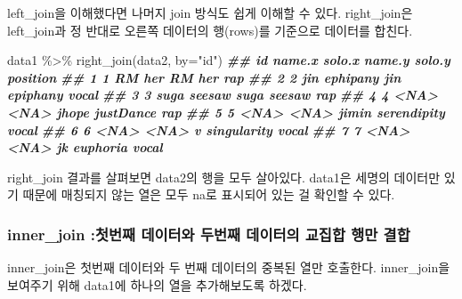 \documentclass[
]{book}
\newenvironment{Shaded}{\begin{snugshade}}{\end{snugshade}}
\newcommand{\AttributeTok}[1]{\textcolor[rgb]{0.77,0.63,0.00}{#1}}
\newcommand{\DocumentationTok}[1]{\textcolor[rgb]{0.56,0.35,0.01}{\textbf{\textit{#1}}}}
\newcommand{\FunctionTok}[1]{\textcolor[rgb]{0.00,0.00,0.00}{#1}}
\newcommand{\NormalTok}[1]{#1}
\newcommand{\SpecialCharTok}[1]{\textcolor[rgb]{0.00,0.00,0.00}{#1}}
\newcommand{\StringTok}[1]{\textcolor[rgb]{0.31,0.60,0.02}{#1}}
\theoremstyle{definition}
\theoremstyle{definition}
\theoremstyle{definition}
\theoremstyle{definition}
\theoremstyle{remark}
\begin{document}
left\_join을 이해했다면 나머지 join 방식도 쉽게 이해할 수 있다. right\_join은 left\_join과 정 반대로 오른쪽 데이터의 행(rows)를 기준으로 데이터를 합친다.

\begin{Shaded}
\begin{Highlighting}[]
\NormalTok{data1 }\SpecialCharTok{\%\textgreater{}\%} 
  \FunctionTok{right\_join}\NormalTok{(data2, }\AttributeTok{by=}\StringTok{"id"}\NormalTok{)}
\DocumentationTok{\#\#   id name.x   solo.x name.y      solo.y position}
\DocumentationTok{\#\# 1  1     RM      her     RM         her      rap}
\DocumentationTok{\#\# 2  2    jin ephipany    jin    epiphany    vocal}
\DocumentationTok{\#\# 3  3   suga   seesaw   suga      seesaw      rap}
\DocumentationTok{\#\# 4  4   \textless{}NA\textgreater{}     \textless{}NA\textgreater{}  jhope   justDance      rap}
\DocumentationTok{\#\# 5  5   \textless{}NA\textgreater{}     \textless{}NA\textgreater{}  jimin serendipity    vocal}
\DocumentationTok{\#\# 6  6   \textless{}NA\textgreater{}     \textless{}NA\textgreater{}      v singularity    vocal}
\DocumentationTok{\#\# 7  7   \textless{}NA\textgreater{}     \textless{}NA\textgreater{}     jk    euphoria    vocal}
\end{Highlighting}
\end{Shaded}

right\_join 결과를 살펴보면 data2의 행을 모두 살아있다. data1은 세명의 데이터만 있기 때문에 매칭되지 않는 열은 모두 na로 표시되어 있는 걸 확인할 수 있다.

\hypertarget{inner_join-uxccabuxbc88uxc9f8-uxb370uxc774uxd130uxc640-uxb450uxbc88uxc9f8-uxb370uxc774uxd130uxc758-uxad50uxc9d1uxd569-uxd589uxb9cc-uxacb0uxd569}{%
\subsubsection{inner\_join :첫번째 데이터와 두번째 데이터의 교집합 행만 결합}\label{inner_join-uxccabuxbc88uxc9f8-uxb370uxc774uxd130uxc640-uxb450uxbc88uxc9f8-uxb370uxc774uxd130uxc758-uxad50uxc9d1uxd569-uxd589uxb9cc-uxacb0uxd569}}

inner\_join은 첫번째 데이터와 두 번째 데이터의 중복된 열만 호출한다. inner\_join을 보여주기 위해 data1에 하나의 열을 추가해보도록 하겠다.
\end{document}
